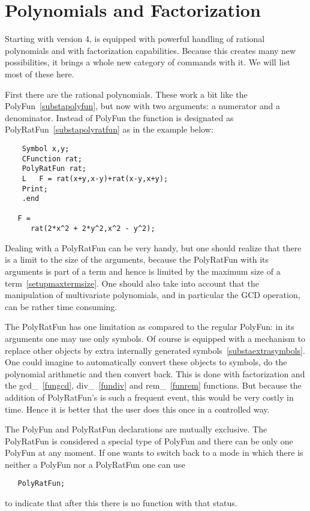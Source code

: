 
\chapter{Polynomials and Factorization}
\label{polynomials}

\noindent Starting with version 4, \FORM{} is equipped with powerful handling 
of rational polynomials and with factorization capabilities. Because this 
creates many new possibilities, it brings a whole new category of commands 
with it. We will list most of these here.

\noindent First there are the rational polynomials. These work a bit like 
the PolyFun~\ref{substapolyfun}, but now with two arguments: a numerator and 
a denominator. Instead of PolyFun the function is designated as 
PolyRatFun~\ref{substapolyratfun} as in the example below:
\begin{verbatim}
    Symbol x,y;
    CFunction rat;
    PolyRatFun rat;
    L   F = rat(x+y,x-y)+rat(x-y,x+y);
    Print;
    .end

   F =
      rat(2*x^2 + 2*y^2,x^2 - y^2);
\end{verbatim}
Dealing with a PolyRatFun can be very handy, but one should realize that 
there is a limit to the size of the arguments, because the PolyRatFun with 
its arguments is part of a term and hence is limited by the maximum size of 
a term~\ref{setupmaxtermsize}. One should also take into account that the 
manipulation of multivariate polynomials, and in particular the GCD 
operation, can be rather time consuming.

\noindent The PolyRatFun has one limitation as compared to the regular 
PolyFun: in its arguments one may use only symbols. Of course \FORM{} is 
equipped with a mechanism to replace other objects by extra internally 
generated symbols~\ref{substaextrasymbols}. One could imagine \FORM{} to 
automatically convert these objects to symbols, do the polynomial 
arithmetic and then convert back. This is done with factorization and the 
gcd\_~\ref{fungcd}, 
div\_~\ref{fundiv} 
and rem\_~\ref{funrem} functions. But 
because the addition of PolyRatFun's is such a frequent event, this would 
be very costly in time. Hence it is better that the user does this once 
in a controlled way.

\noindent The PolyFun and PolyRatFun declarations are mutually exclusive. 
The PolyRatFun is considered a special type of PolyFun and there can be 
only one PolyFun at any moment. If one wants to switch back to a mode in 
which there is neither a PolyFun nor a PolyRatFun one can use
\begin{verbatim}
   PolyRatFun;
\end{verbatim}
to indicate that after this there is no function with that status.

